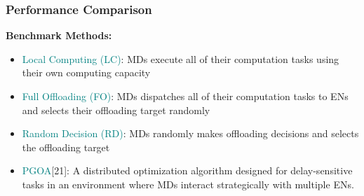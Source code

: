 \begin{frame}
	\frametitle{Performance Comparison}
	
	\textbf{Benchmark Methods:}
			\vspace{4mm}
	
	\begin{itemize}[]
		
		\item \textcolor{teal}{Local Computing (LC)}:  MDs execute all of their computation tasks using their own computing capacity 
					\vspace{2mm}
		\item \textcolor{teal}{Full Offloading (FO)}: MDs dispatches all of their computation tasks to ENs and selects their offloading target randomly
					\vspace{2mm}
		\item \textcolor{teal}{Random Decision (RD)}: MDs randomly makes offloading decisions and selects the offloading target 
					\vspace{2mm}
		\item \textcolor{teal}{PGOA}[21]: A distributed optimization algorithm designed for delay-sensitive tasks in an environment where MDs interact strategically with multiple ENs.
		
	\end{itemize}
	
\end{frame}

